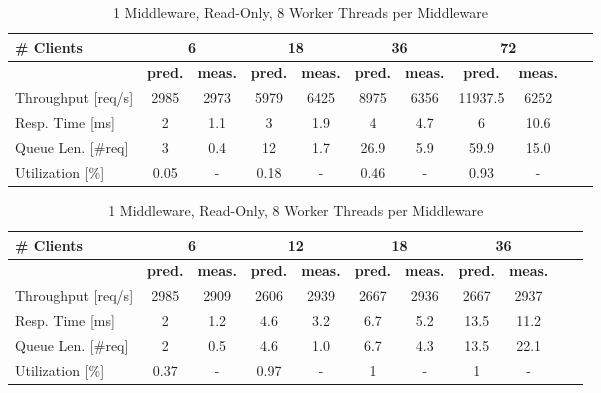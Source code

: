 \documentclass[11pt,a4paper]{article}
\begin{document}
\begin{table}
    \begin{subtable}{1.0\linewidth}\centering
        \begin{tabular}{|l|c|c|c|c|c|c|c|c|c|c|}
        \hline
        \# Clients & \multicolumn{2}{|c|}{\textbf{6}}  & \multicolumn{2}{|c|}{\textbf{18}} & \multicolumn{2}{|c|}{\textbf{36}} & \multicolumn{2}{|c|}{\textbf{72}}\\
        \hline
         & \textbf{pred.} & \textbf{meas.} &  \textbf{pred.} & \textbf{meas.} &  \textbf{pred.} & \textbf{meas.} &  \textbf{pred.} & \textbf{meas.} \\
        \hline
        Throughput [req/s] & 2985 & 2973 & 5979 & 6425 & 8975 & 6356 &  11937.5 & 6252\\
        Resp. Time [ms] & 2 & 1.1 & 3 & 1.9 & 4 & 4.7 & 6 & 10.6\\
        Queue Len. [\#req]& 3 & 0.4 & 12 & 1.7 & 26.9 & 5.9 & 59.9 & 15.0\\
        Utilization [\%] & 0.05 & - & 0.18 & - & 0.46 & - & 0.93 & -\\
        \hline
        \end{tabular}
    \caption{1 Middleware, Write-Only, 64 Worker Threads per Middleware}
    \end{subtable}

    \begin{subtable}{1.0\linewidth}\centering
        \begin{tabular}{|l|c|c|c|c|c|c|c|c|c|c|}
        \hline
        \# Clients & \multicolumn{2}{|c|}{\textbf{6}}  & \multicolumn{2}{|c|}{\textbf{12}} & \multicolumn{2}{|c|}{\textbf{18}} & \multicolumn{2}{|c|}{\textbf{36}}\\
        \hline
         & \textbf{pred.} & \textbf{meas.} &  \textbf{pred.} & \textbf{meas.} &  \textbf{pred.} & \textbf{meas.} &  \textbf{pred.} & \textbf{meas.} \\
        \hline
        Throughput [req/s] & 2985 & 2909 & 2606 & 2939 & 2667 & 2936 & 2667 & 2937\\
        Resp. Time [ms]  & 2 & 1.2 & 4.6 & 3.2 & 6.7 & 5.2 & 13.5 & 11.2\\
        Queue Len. [\#req] & 2 & 0.5 & 4.6 & 1.0 & 6.7 & 4.3 & 13.5 & 22.1\\
        Utilization [\%] & 0.37 & - & 0.97 & - & 1 & - & 1 & -\\
        \hline
        \end{tabular}
    \caption{1 Middleware, Read-Only, 8 Worker Threads per Middleware }
    \end{subtable}



\end{table}
\end{document}
